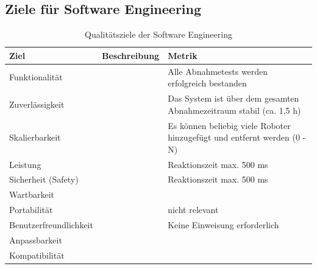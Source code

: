 \subsection{Ziele für Software Engineering}
\begin{table}[h!]
    \centering
    \begin{tabular}{p{4cm}|p{5cm}|p{5cm}|}
        \hline
        \textbf{Ziel} & \textbf{Beschreibung} & \textbf{Metrik} \\
        \hline
        Funktionalität &  
        & Alle Abnahmetests werden erfolgreich bestanden
        \\
        \hline
        Zuverlässigkeit & 
        & Das System ist über dem gesamten Abnahmezeitraum stabil (ca. 1,5 h)
        \\
        \hline
        Skalierbarkeit & 
        & Es können beliebig viele Roboter hinzugefügt und entfernt werden (0 - N)
        \\
        \hline
        Leistung & 
        & Reaktionszeit max. 500 ms
        \\
        \hline
        Sicherheit (Safety) & 
        & Reaktionszeit max. 500 ms
        \\
        \hline
        Wartbarkeit & 
        & 
        \\
        \hline
        Portabilität & %
        & nicht relevant
        \\
        \hline
        Benutzerfreundlichkeit & %
        & Keine Einweisung erforderlich
        \\
        \hline
        Anpassbarkeit & 
        & 
        \\
        \hline
        Kompatibilität & 
        & 
        \\
        \hline
    \end{tabular}
    \caption{Qualitätsziele der Software Engineering}
    \label{tab:seziele}
\end{table}

